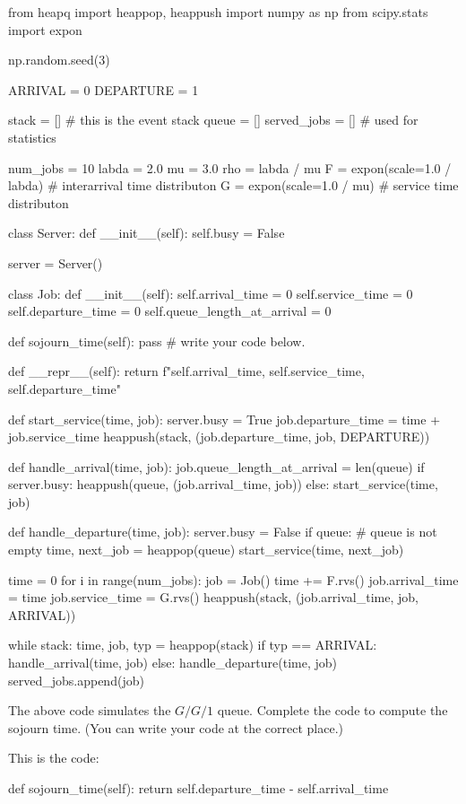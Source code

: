 \begin{pyverbatim}[stdout][numbers=left]
from heapq import heappop, heappush
import numpy as np
from scipy.stats import expon

np.random.seed(3)

ARRIVAL = 0
DEPARTURE = 1

stack = [] # this is the event stack
queue = []
served_jobs = [] # used for statistics

num_jobs = 10
labda = 2.0
mu = 3.0
rho = labda / mu
F = expon(scale=1.0 / labda) # interarrival time distributon
G = expon(scale=1.0 / mu) # service time distributon


class Server:
 def __init__(self):
 self.busy = False


server = Server()


class Job:
 def __init__(self):
 self.arrival_time = 0
 self.service_time = 0
 self.departure_time = 0
 self.queue_length_at_arrival = 0

 def sojourn_time(self):
 pass # write your code below.
 

 def __repr__(self):
 return f"{self.arrival_time}, {self.service_time}, {self.departure_time}\n"


def start_service(time, job):
 server.busy = True
 job.departure_time = time + job.service_time
 heappush(stack, (job.departure_time, job, DEPARTURE))


def handle_arrival(time, job):
 job.queue_length_at_arrival = len(queue)
 if server.busy:
 heappush(queue, (job.arrival_time, job))
 else:
 start_service(time, job)


def handle_departure(time, job):
 server.busy = False
 if queue: # queue is not empty
 time, next_job = heappop(queue)
 start_service(time, next_job)


time = 0
for i in range(num_jobs):
 job = Job()
 time += F.rvs()
 job.arrival_time = time
 job.service_time = G.rvs()
 heappush(stack, (job.arrival_time, job, ARRIVAL))


while stack:
 time, job, typ = heappop(stack)
 if typ == ARRIVAL:
 handle_arrival(time, job)
 else:
 handle_departure(time, job)
 served_jobs.append(job)

\end{pyverbatim}

\begin{exercise}[201907]\label{ex:2019_2_4}
The above code simulates the $G/G/1$ queue. Complete the code to compute the sojourn time. (You can write your code at the correct place.)

\begin{solution}
 This is the code:
 \begin{pyverbatim}
 def sojourn_time(self):
 return self.departure_time - self.arrival_time

 \end{pyverbatim}
 
\end{solution}
\end{exercise}

